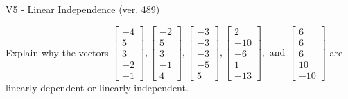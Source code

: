\begin{exercise}
  \begin{exerciseTitle}V5 - Linear Independence (ver. 489)\end{exerciseTitle}
  \begin{exerciseStatement}
    Explain why the vectors \(\left[\begin{array}{r}
-4 \\
5 \\
3 \\
-2 \\
-1
\end{array}\right] , \left[\begin{array}{r}
-2 \\
5 \\
3 \\
-1 \\
4
\end{array}\right] , \left[\begin{array}{r}
-3 \\
-3 \\
-3 \\
-5 \\
5
\end{array}\right] , \left[\begin{array}{r}
2 \\
-10 \\
-6 \\
1 \\
-13
\end{array}\right] , \text{ and } \left[\begin{array}{r}
6 \\
6 \\
6 \\
10 \\
-10
\end{array}\right]\) are linearly dependent or linearly independent.	



\end{exerciseStatement}
\end{exercise}
